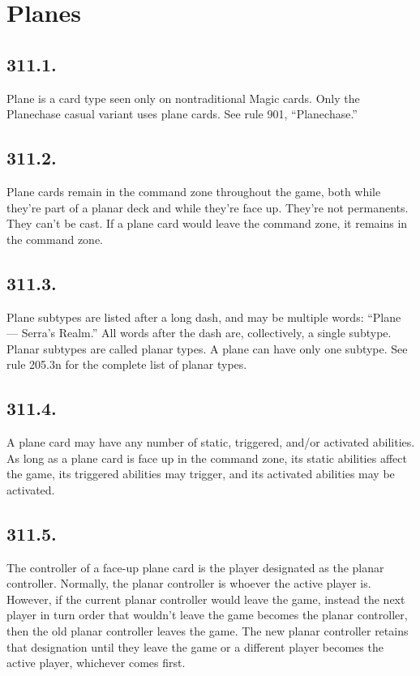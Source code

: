 \section{Planes}
\subsection*{311.1.}
Plane is a card type seen only on nontraditional Magic cards. Only the Planechase casual variant uses plane cards. See rule 901, “Planechase.”

\subsection*{311.2.}
Plane cards remain in the command zone throughout the game, both while they’re part of a planar deck and while they’re face up. They’re not permanents. They can’t be cast. If a plane card would leave the command zone, it remains in the command zone.

\subsection*{311.3.}
Plane subtypes are listed after a long dash, and may be multiple words: “Plane — Serra’s Realm.” All words after the dash are, collectively, a single subtype. Planar subtypes are called planar types. A plane can have only one subtype. See rule 205.3n for the complete list of planar types.

\subsection*{311.4.}
A plane card may have any number of static, triggered, and/or activated abilities. As long as a plane card is face up in the command zone, its static abilities affect the game, its triggered abilities may trigger, and its activated abilities may be activated.

\subsection*{311.5.}
The controller of a face-up plane card is the player designated as the planar controller. Normally, the planar controller is whoever the active player is. However, if the current planar controller would leave the game, instead the next player in turn order that wouldn’t leave the game becomes the planar controller, then the old planar controller leaves the game. The new planar controller retains that designation until they leave the game or a different player becomes the active player, whichever comes first.

